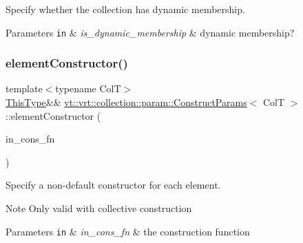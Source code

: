 Specify whether the collection has dynamic membership. 


\begin{DoxyParams}[1]{Parameters}
\mbox{\tt in}  & {\em is\+\_\+dynamic\+\_\+membership} & dynamic membership? \\
\hline
\end{DoxyParams}
\mbox{\label{structvt_1_1vrt_1_1collection_1_1param_1_1_construct_params_a1a9710ed590f69867feccae0f432b724}} 
\subsubsection{\texorpdfstring{element\+Constructor()}{elementConstructor()}}
{\footnotesize\ttfamily template$<$typename ColT$>$ \\
\hyperlink{structvt_1_1vrt_1_1collection_1_1param_1_1_construct_params_a13d4910c0f6825c7b0ddfebce5288bea}{This\+Type}\&\& \hyperlink{structvt_1_1vrt_1_1collection_1_1param_1_1_construct_params}{vt\+::vrt\+::collection\+::param\+::\+Construct\+Params}$<$ ColT $>$\+::element\+Constructor (\begin{DoxyParamCaption}\item[{\hyperlink{structvt_1_1vrt_1_1collection_1_1param_1_1_construct_params_a7ad7bdf4220701e54b485f45e08b1736}{Construct\+Fn\+Type}}]{in\+\_\+cons\+\_\+fn }\end{DoxyParamCaption})\hspace{0.3cm}{\ttfamily [inline]}}



Specify a non-\/default constructor for each element. 

\begin{DoxyNote}{Note}
Only valid with collective construction
\end{DoxyNote}

\begin{DoxyParams}[1]{Parameters}
\mbox{\tt in}  & {\em in\+\_\+cons\+\_\+fn} & the construction function \\
\hline
\end{DoxyParams}
\mbox{\label{structvt_1_1vrt_1_1collection_1_1param_1_1_construct_params_ae6f31177ec60c98d598b6df9eda8d06a}} 

